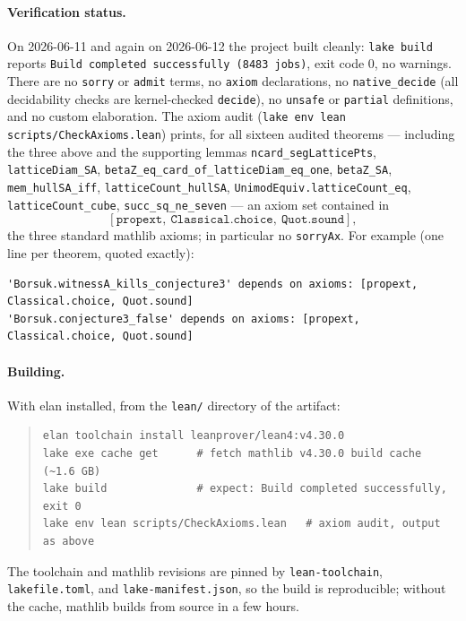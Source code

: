 \documentclass[11pt]{article}
\theoremstyle{remark}
\begin{document}
\paragraph{Verification status.}
On 2026-06-11 and again on 2026-06-12 the project built cleanly:
\texttt{lake build} reports \texttt{Build completed successfully (8483
jobs)}, exit code $0$, no warnings. There are no \texttt{sorry} or
\texttt{admit} terms, no \texttt{axiom} declarations, no
\texttt{native\_decide} (all decidability checks are kernel-checked
\texttt{decide}), no \texttt{unsafe} or \texttt{partial} definitions, and no
custom elaboration. The axiom audit (\texttt{lake env lean
scripts/CheckAxioms.lean}) prints, for all sixteen audited theorems ---
including the three above and the supporting lemmas
\texttt{ncard\_segLatticePts}, \texttt{latticeDiam\_SA},
\texttt{betaZ\_eq\_card\_of\_latticeDiam\_eq\_one}, \texttt{betaZ\_SA},
\texttt{mem\_hullSA\_iff}, \texttt{latticeCount\_hullSA},
\texttt{UnimodEquiv.latticeCount\_eq}, \texttt{latticeCount\_cube},
\texttt{succ\_sq\_ne\_seven} --- an axiom set contained in
\[
[\texttt{propext},\ \texttt{Classical.choice},\ \texttt{Quot.sound}],
\]
the three standard mathlib axioms; in particular no \texttt{sorryAx}. For
example (one line per theorem, quoted exactly):
{\scriptsize
\begin{verbatim}
'Borsuk.witnessA_kills_conjecture3' depends on axioms: [propext, Classical.choice, Quot.sound]
'Borsuk.conjecture3_false' depends on axioms: [propext, Classical.choice, Quot.sound]
\end{verbatim}
}

\paragraph{Building.}
With elan installed, from the \texttt{lean/} directory of the artifact:
\begin{quote}\small
\begin{verbatim}
elan toolchain install leanprover/lean4:v4.30.0
lake exe cache get      # fetch mathlib v4.30.0 build cache (~1.6 GB)
lake build              # expect: Build completed successfully, exit 0
lake env lean scripts/CheckAxioms.lean   # axiom audit, output as above
\end{verbatim}
\end{quote}
The toolchain and mathlib revisions are pinned by \texttt{lean-toolchain},
\texttt{lakefile.toml}, and \texttt{lake-manifest.json}, so the build is
reproducible; without the cache, mathlib builds from source in a few hours.
\end{document}
